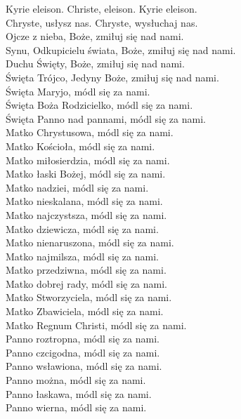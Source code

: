 ﻿\documentclass[9pt,twoside]{extarticle}
\begin{document}
Kyrie eleison. \hfill Christe, eleison. Kyrie eleison.\\
Chryste, usłysz nas. \hfill Chryste, wysłuchaj nas.\\
Ojcze z nieba, Boże, \hfill zmiłuj się nad nami. \\
Synu, Odkupicielu świata, Boże, \hfill zmiłuj się nad nami. \\
Duchu Święty, Boże, \hfill zmiłuj się nad nami. \\
Święta Trójco, Jedyny Boże, \hfill zmiłuj się nad nami. \\
Święta Maryjo, \hfill módl się za nami.\\
Święta Boża Rodzicielko, \hfill módl się za nami.\\
Święta Panno nad pannami, \hfill módl się za nami.\\
Matko Chrystusowa, \hfill módl się za nami.\\
Matko Kościoła, \hfill módl się za nami.\\
Matko miłosierdzia, \hfill módl się za nami.\\
Matko łaski Bożej, \hfill módl się za nami.\\
Matko nadziei, \hfill módl się za nami.\\
Matko nieskalana, \hfill módl się za nami.\\
Matko najczystsza, \hfill módl się za nami.\\
Matko dziewicza, \hfill módl się za nami.\\
Matko nienaruszona, \hfill módl się za nami.\\
Matko najmilsza, \hfill módl się za nami.\\
Matko przedziwna, \hfill módl się za nami.\\
Matko dobrej rady, \hfill módl się za nami.\\
Matko Stworzyciela, \hfill módl się za nami.\\
Matko Zbawiciela, \hfill módl się za nami.\\
Matko Regnum Christi, \hfill módl się za nami.\\
Panno roztropna, \hfill módl się za nami.\\
Panno czcigodna, \hfill módl się za nami.\\
Panno wsławiona, \hfill módl się za nami.\\
Panno można, \hfill módl się za nami.\\
Panno łaskawa, \hfill módl się za nami.\\
Panno wierna, \hfill módl się za nami.\\
\end{document}
